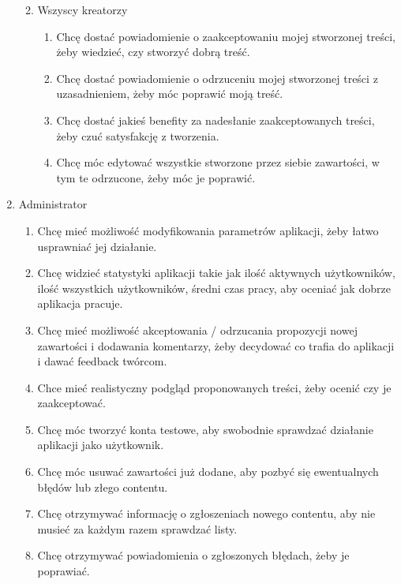 \documentclass{article}
\begin{document}
\begin{tcolorbox}
\begin{enumerate}
\begin{enumerate}
\begin{enumerate}
                        \end{enumerate}
                  \item Wszyscy kreatorzy
                        \begin{enumerate}
                            \item Chcę dostać powiadomienie o zaakceptowaniu mojej stworzonej treści, żeby wiedzieć, czy stworzyć dobrą treść.
                            \item Chcę dostać powiadomienie o odrzuceniu mojej stworzonej treści z uzasadnieniem, żeby móc poprawić moją treść.
                            \item Chcę dostać jakieś benefity za nadesłanie zaakceptowanych treści, żeby czuć satysfakcję z tworzenia.
                            \item Chcę móc edytować wszystkie stworzone przez siebie zawartości, w tym te odrzucone, żeby móc je poprawić.
                        \end{enumerate}
              \end{enumerate}
        \item Administrator
              \begin{enumerate}
                  \item Chcę mieć możliwość modyfikowania parametrów aplikacji, żeby łatwo usprawniać jej działanie.
                  \item Chcę widzieć statystyki aplikacji takie jak ilość aktywnych użytkowników, ilość wszystkich użytkowników, średni czas pracy, aby oceniać jak dobrze aplikacja pracuje.
                  \item Chcę mieć możliwość akceptowania / odrzucania propozycji nowej zawartości i dodawania komentarzy, żeby decydować co trafia do aplikacji i dawać feedback twórcom.
                  \item Chce mieć realistyczny podgląd proponowanych treści, żeby ocenić czy je zaakceptować.
                  \item Chcę móc tworzyć konta testowe, aby swobodnie sprawdzać działanie aplikacji jako użytkownik.
                  \item Chcę móc usuwać zawartości już dodane, aby pozbyć się ewentualnych błędów lub złego contentu.
                  \item Chcę otrzymywać informację o zgłoszeniach nowego contentu, aby nie musieć za każdym razem sprawdzać listy.
                  \item Chcę otrzymywać powiadomienia o zgłoszonych błędach, żeby je poprawiać.
              \end{enumerate}
    \end{enumerate}
\end{tcolorbox}
\end{document}
